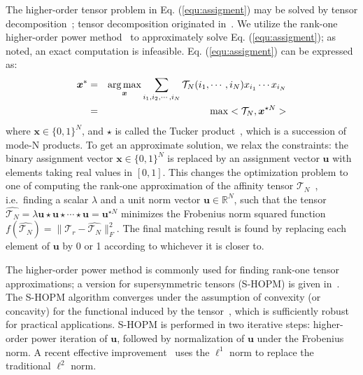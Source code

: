The higher-order tensor problem in Eq. (\ref{equ:assigment}) may be solved by tensor decomposition~\cite{Kolda08};
tensor decomposition originated in~\cite{Hitchcock27}.
We utilize the rank-one higher-order power method~\cite{Lathauwer95} to approximately solve Eq. (\ref{equ:assigment}); as noted, an exact computation is infeasible.
Eq. (\ref{equ:assigment}) can be expressed as:
\begin{eqnarray}
\label{equ:assigment2}
{\boldsymbol{x}}^* &=& \argmax_{\boldsymbol{x}} \sum_{i_1,i_2,\cdots,i_N} \mathcal{T}_N(i_1,\cdots,i_N) x_{i_1} \cdots x_{i_N} \nonumber\\
&=& \max <\mathcal{T}_N, \boldsymbol{x}^{\star N}>
\end{eqnarray}
where $\boldsymbol{x} \in \{0,1\}^{N}$, and $\star$ is called the Tucker product~\cite{Kofidis02}, which is a succession of mode-N products.
To get an approximate solution, we relax the constraints:
the binary assignment vector $\boldsymbol{x}\in \{0,1\}^{N}$ is replaced by an assignment vector $\boldsymbol{u}$ with elements taking real values in $[0,1]$.
This changes the optimization problem to one of computing the rank-one approximation of the affinity tensor $\mathcal{T}_N$~\cite{Kofidis02},
i.e.\ finding a scalar $\lambda$ and a unit norm vector $\boldsymbol{u}\in \mathbb{R}^{N}$,
such that the tensor $\hat{\mathcal{T}_N} = \lambda \boldsymbol{u}\star \boldsymbol{u} \star\cdots \star \boldsymbol{u}=\boldsymbol{u}^{\star N}$ minimizes the Frobenius norm squared function $f(\hat{\mathcal{T}_N})=\lVert \mathcal{T}_r-\hat{\mathcal{T}_N} \lVert^2_F$.
The final matching result is found by replacing each element of $\boldsymbol{u}$ by 0 or 1 according to whichever it is closer to.

The higher-order power method is commonly used for finding rank-one tensor approximations; a version for supersymmetric tensors (S-HOPM) is given in~\cite{Kofidis02}.
The S-HOPM algorithm converges under the assumption of convexity (or concavity) for the functional induced by the tensor~\cite{Kofidis02},
which is sufficiently robust for practical applications.
S-HOPM is performed in two iterative steps: higher-order power iteration of $\boldsymbol{u}$, followed by normalization of $\boldsymbol{u}$ under the Frobenius norm.
A recent effective improvement~\cite{Duchenne09,Duchenne2011} uses the $\mathcal{\ell}^1$ norm to replace the traditional $\mathcal{\ell}^2$ norm.


